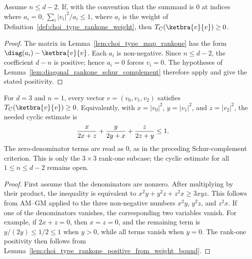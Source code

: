 \begin{lemma}
    \label{lem:choi_type_rankone_positive_from_weight_bound}
    \leanok
    Assume $n\le d-2$. If, with the convention that the summand is $0$ at
    indices where $a_i=0$, $\sum_i |v_i|^2/a_i\le 1$, where $a_i$ is the weight
    of Definition~\ref{def:choi_type_rankone_weight}, then
    $T_C(\ketbra{v}{v})\ge 0$.
\end{lemma}

\begin{proof}
    \leanok
    The matrix in Lemma~\ref{lem:choi_type_map_rankone} has the form
    $\diag(a_i)-\ketbra{v}{v}$. Each $a_i$ is non-negative. Since
    $n\le d-2$, the coefficient $d-n$ is positive; hence $a_i=0$ forces
    $v_i=0$. The hypotheses of
    Lemma~\ref{lem:diagonal_rankone_schur_complement} therefore apply and give
    the stated positivity.
\end{proof}

\begin{lemma}
    \label{lem:choi_type_first_cyclic_reciprocal_subcase}
    \leanok
    For $d=3$ and $n=1$, every vector $v=(v_0,v_1,v_2)$ satisfies
    $T_C(\ketbra{v}{v})\ge0$. Equivalently, with
    $x=|v_0|^2$, $y=|v_1|^2$, and $z=|v_2|^2$, the needed cyclic estimate is
    \begin{align}
        \frac{x}{2x+z}+\frac{y}{2y+x}+\frac{z}{2z+y}
         & \le1.
        \notag
    \end{align}
    The zero-denominator terms are read as $0$, as in the preceding
    Schur-complement criterion. This is only the $3\times3$ rank-one subcase;
    the cyclic estimate for all $1\le n\le d-2$ remains open.
\end{lemma}

\begin{proof}
    \leanok
    First assume that the denominators are nonzero. After multiplying by their
    product, the inequality is equivalent to
    $x^2y+y^2z+z^2x\ge3xyz$. This follows from AM--GM applied to the three
    non-negative numbers $x^2y$, $y^2z$, and $z^2x$. If one of the denominators
    vanishes, the corresponding two variables vanish. For example, if
    $2x+z=0$, then $x=z=0$, and the remaining term is
    $y/(2y)\le1/2\le1$ when $y>0$, while all terms vanish when $y=0$. The
    rank-one positivity then follows from
    Lemma~\ref{lem:choi_type_rankone_positive_from_weight_bound}.
\end{proof}

